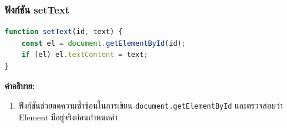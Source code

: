 \subsubsection{ฟังก์ชัน setText}
\begin{lstlisting}[language=JavaScript, caption={ฟังก์ชัน setText ใน user/profile.js}, label={code:user-profile-helper}]
function setText(id, text) {
    const el = document.getElementById(id);
    if (el) el.textContent = text;
}
\end{lstlisting}

\textbf{คำอธิบาย:}
\begin{enumerate}
    \item ฟังก์ชันช่วยลดความซ้ำซ้อนในการเขียน \texttt{document.getElementById} และตรวจสอบว่า Element มีอยู่จริงก่อนกำหนดค่า
\end{enumerate}
